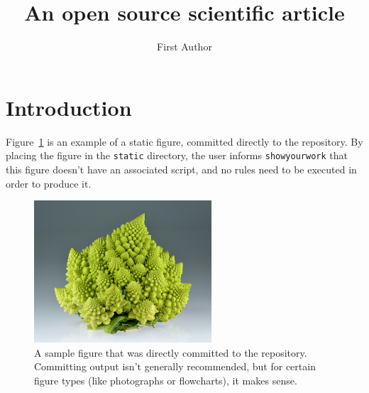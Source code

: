 \documentclass[twocolumn]{aastex631}
\begin{document}
\title{An open source scientific article}

\author{First Author}

\begin{abstract}
    \blindtext
\end{abstract}

\section{Introduction}

Figure~\ref{fig:broccoli} is an example of a static figure, committed directly to the repository.
By placing the figure in the \texttt{static} directory, the user informs \texttt{showyourwork} that this figure doesn't have an associated script, and no rules need to be executed in order to produce it.

\begin{figure}[ht!]
    \begin{centering}
        \includegraphics[width=0.4\linewidth]{static/broccoli.pdf}
        \caption{
            A sample figure that was directly committed to the repository.
            Committing output isn't generally recommended, but for certain figure types (like photographs or flowcharts), it makes sense.
        }
        \label{fig:broccoli}
    \end{centering}
\end{figure}
\end{document}
